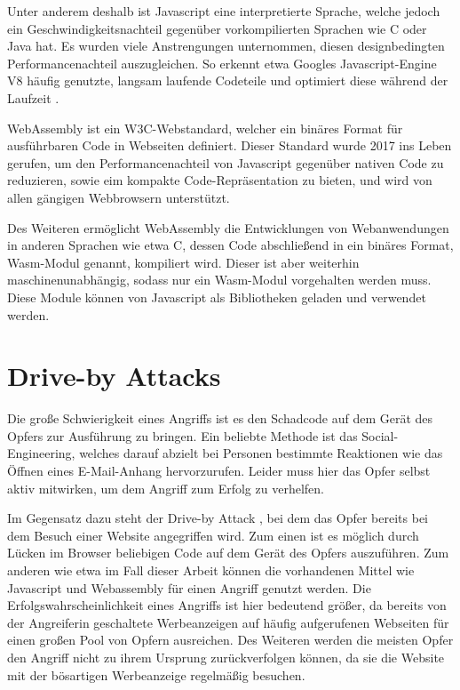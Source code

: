 Unter anderem deshalb ist Javascript eine interpretierte Sprache, welche jedoch ein Geschwindigkeitsnachteil gegenüber vorkompilierten Sprachen wie C oder Java hat.
Es wurden viele Anstrengungen unternommen, diesen designbedingten Performancenachteil auszugleichen. 
So erkennt etwa Googles Javascript-Engine V8 häufig genutzte, langsam laufende Codeteile und optimiert diese während der Laufzeit \cite{GoogleTurboFan}.

WebAssembly ist ein W3C-Webstandard, welcher ein binäres Format für ausführbaren Code in Webseiten definiert. 
Dieser Standard wurde 2017 ins Leben gerufen, um den Performancenachteil von Javascript gegenüber nativen Code zu reduzieren, sowie eim kompakte Code-Repräsentation zu bieten, und wird von allen gängigen Webbrowsern unterstützt.

Des Weiteren ermöglicht WebAssembly die Entwicklungen von Webanwendungen in anderen Sprachen wie etwa C, dessen Code abschließend in ein binäres Format, Wasm-Modul genannt, kompiliert wird.
Dieser ist aber weiterhin maschinenunabhängig, sodass nur ein Wasm-Modul vorgehalten werden muss.
Diese Module können von Javascript als Bibliotheken geladen und verwendet werden.

\section{Drive-by Attacks}

Die große Schwierigkeit eines Angriffs ist es den Schadcode auf dem Gerät des Opfers zur Ausführung zu bringen. Ein beliebte Methode ist das Social-Engineering, welches darauf abzielt bei Personen bestimmte Reaktionen wie das Öffnen eines E-Mail-Anhang hervorzurufen. Leider muss hier das Opfer selbst aktiv mitwirken, um dem Angriff zum Erfolg zu verhelfen.

Im Gegensatz dazu steht der Drive-by Attack \cite{DriveByAttacksGeneric}, bei dem das Opfer bereits bei dem Besuch einer Website angegriffen wird. Zum einen ist es möglich durch Lücken im Browser beliebigen Code auf dem Gerät des Opfers auszuführen. Zum anderen wie etwa im Fall dieser Arbeit können die vorhandenen Mittel wie Javascript und Webassembly für einen Angriff genutzt werden.
Die Erfolgswahrscheinlichkeit eines Angriffs ist hier bedeutend größer, da bereits von der Angreiferin geschaltete Werbeanzeigen auf häufig aufgerufenen Webseiten für einen großen Pool von Opfern ausreichen.
Des Weiteren werden die meisten Opfer den Angriff nicht zu ihrem Ursprung zurückverfolgen können, da sie die Website mit der bösartigen Werbeanzeige regelmäßig besuchen.

